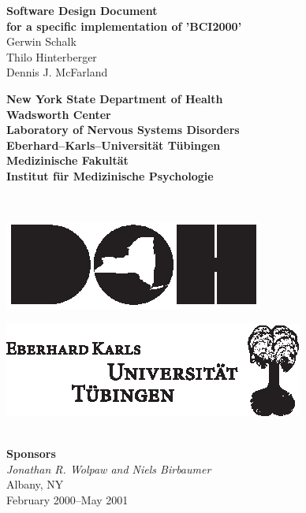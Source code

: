 \begin{titlepage}
\hspace{-7mm}
\begin{minipage}{\textwidth}
\begin{center}
\vspace{.5cm}
{\huge \bf Software Design Document\\[1.5ex]}
{\large \bf for a specific implementation of 'BCI2000'}
\\[1.5cm]
{\Large Gerwin Schalk\\}
{\Large Thilo Hinterberger\\}
{\Large Dennis J. McFarland\\[1.5cm]}
%
\begin{minipage}{13cm}
  \begin{minipage}[c]{13cm}
    \begin{center}
      {\Large \bf New York State Department of Health\\[2ex]}
      {\large \bf Wadsworth Center\\[0.5ex]
       Laboratory of Nervous Systems Disorders\\[4ex]}
      {\Large \bf Eberhard--Karls--Universit\"at T\"ubingen\\[2ex]}
      {\large \bf Medizinische Fakult\"at\\[0.5ex]
       Institut f\"ur Medizinische Psychologie\\[0.5ex]}
    \end{center}
  \end{minipage}
  \\[1.0cm]
  \begin{minipage}[c]{6cm}
    \centerline{\includegraphics{figures/DOHlogo.eps}}
  \end{minipage}
  \hspace{1.5cm}
  \begin{minipage}[c]{3cm}
    \centerline{\includegraphics{figures/EKUlogo.eps}}
  \end{minipage}
\end{minipage}
%
\\[2.0cm]
\textbf{Sponsors} \\
\textit{Jonathan R. Wolpaw and Niels Birbaumer}
\\[1.5cm]
{Albany, NY} \\[1ex]
{February 2000--May 2001}
\end{center}
\end{minipage}
\end{titlepage}
